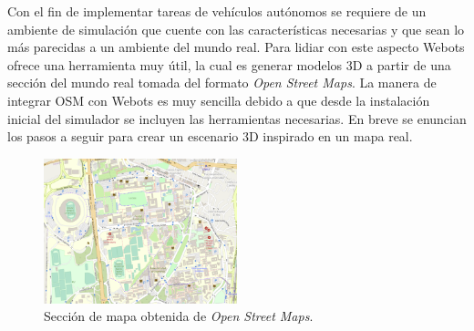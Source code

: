Con el fin de implementar tareas de vehículos autónomos se requiere de un ambiente de simulación que cuente con las características necesarias y que sean lo más parecidas a un ambiente del mundo real. Para lidiar con este aspecto Webots ofrece una herramienta muy útil, la cual es generar modelos 3D a partir de una sección del mundo real tomada del formato \textit{Open Street Maps}. La manera de integrar OSM con Webots es muy sencilla debido a que desde la instalación inicial del simulador se incluyen las herramientas necesarias. En breve se enuncian los pasos a seguir para crear un escenario 3D inspirado en un mapa real.
\begin{figure}
        \centering
        \includegraphics[width=0.5\textwidth]{Figures/Figures_Cap03/cu_osm.png}
        \caption{Sección de mapa obtenida de \textit{Open Street Maps}.}
        \label{fig:cu_osm}
\end{figure}


